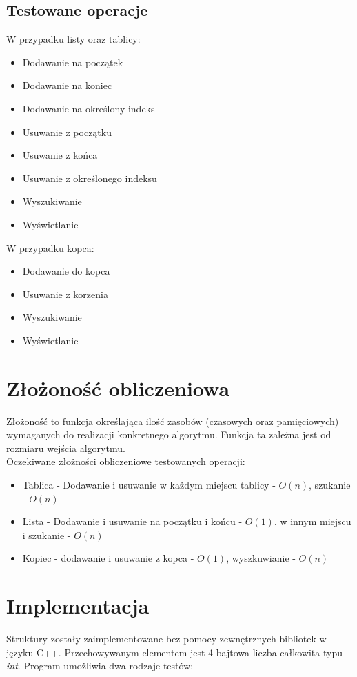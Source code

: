 \documentclass{article}
\begin{document}
\subsection{Testowane operacje}
W przypadku listy oraz tablicy:
\begin{itemize}
    \item Dodawanie na początek
    \item Dodawanie na koniec
    \item Dodawanie na określony indeks
    \item Usuwanie z początku
    \item Usuwanie z końca
    \item Usuwanie z określonego indeksu
    \item Wyszukiwanie
    \item Wyświetlanie
\end{itemize}
W przypadku kopca:
\begin{itemize}
    \item Dodawanie do kopca
    \item Usuwanie z korzenia
    \item Wyszukiwanie
    \item Wyświetlanie
\end{itemize}
\newpage

\section{Złożoność obliczeniowa}
Złożoność to funkcja określająca ilość zasobów (czasowych oraz pamięciowych) wymaganych do realizacji konkretnego algorytmu. Funkcja ta zależna jest od rozmiaru wejścia algorytmu. \\

Oczekiwane złożności obliczeniowe testowanych operacji:

\begin{itemize}
    \item Tablica - Dodawanie i usuwanie w każdym miejscu tablicy - $O(n)$, szukanie - $O(n)$
    \item Lista - Dodawanie i usuwanie na początku i końcu - $O(1)$, w innym miejscu i szukanie - $O(n)$
    \item Kopiec - dodawanie i usuwanie z kopca - $O(1)$, wyszkuwianie - $O(n)$
\end{itemize}

\section{Implementacja}
Struktury zostały zaimplementowane bez pomocy zewnętrznych bibliotek w języku C++. Przechowywanym elementem jest 4-bajtowa liczba całkowita typu \textit{int}.
Program umożliwia dwa rodzaje testów:
\end{document}
